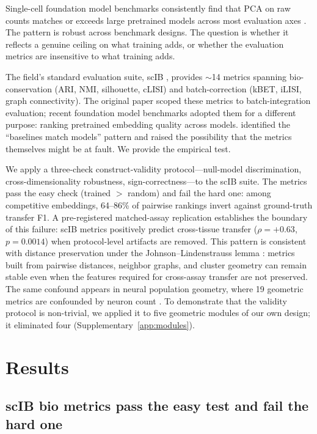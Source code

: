 \documentclass[11pt]{article}
\begin{document}
Single-cell foundation model benchmarks consistently find that PCA on raw counts matches or exceeds large pretrained models across most evaluation axes \citep{wu2025scfm, vcbench2026, unifiedscfm2026, cellxgeneintegration2026}. The pattern is robust across benchmark designs. The question is whether it reflects a genuine ceiling on what training adds, or whether the evaluation metrics are insensitive to what training adds.

The field's standard evaluation suite, scIB \citep{luecken2022scib}, provides $\sim$14 metrics spanning bio-conservation (ARI, NMI, silhouette, cLISI) and batch-correction (kBET, iLISI, graph connectivity). The original paper scoped these metrics to batch-integration evaluation; recent foundation model benchmarks \citep{wu2025scfm, vcbench2026, unifiedscfm2026, cellxgeneintegration2026} adopted them for a different purpose: ranking pretrained embedding quality across models. \citet{wu2025scfm} identified the ``baselines match models'' pattern and raised the possibility that the metrics themselves might be at fault. We provide the empirical test.

We apply a three-check construct-validity protocol---null-model discrimination, cross-dimensionality robustness, sign-correctness---to the scIB suite. The metrics pass the easy check (trained $>$ random) and fail the hard one: among competitive embeddings, 64--86\% of pairwise rankings invert against ground-truth transfer F1. A pre-registered matched-assay replication establishes the boundary of this failure: scIB metrics positively predict cross-tissue transfer ($\rho = +0.63$, $p = 0.0014$) when protocol-level artifacts are removed. This pattern is consistent with distance preservation under the Johnson--Lindenstrauss lemma \citep{johnsonlindenstrauss1984}: metrics built from pairwise distances, neighbor graphs, and cluster geometry can remain stable even when the features required for cross-assay transfer are not preserved. The same confound appears in neural population geometry, where 19 geometric metrics are confounded by neuron count \citep{tower2026bracket}. To demonstrate that the validity protocol is non-trivial, we applied it to five geometric modules of our own design; it eliminated four (Supplementary~\ref{app:modules}).


\section{Results}

\subsection{scIB bio metrics pass the easy test and fail the hard one}
\label{sec:scib}
\end{document}
